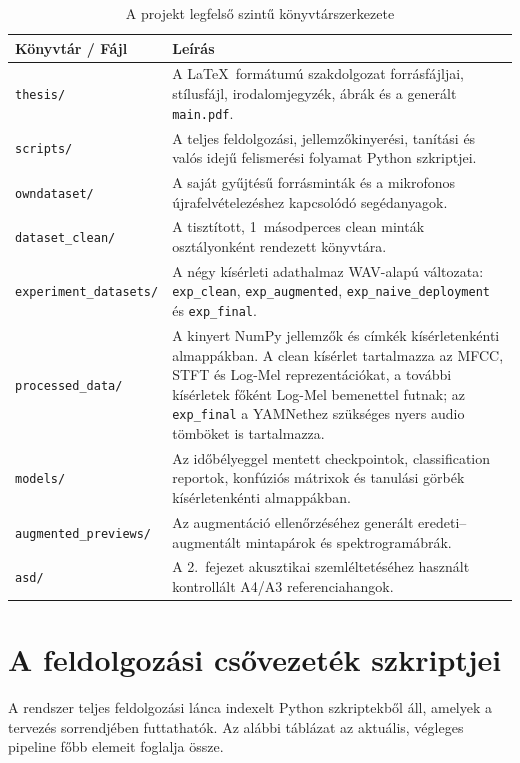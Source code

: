 \begin{table}[ht!]
\centering
\small
\caption{A projekt legfelső szintű könyvtárszerkezete}
\label{tab:konyvtarszerkezet}
\begin{tabular}{p{4.5cm}p{10cm}}
\toprule
\textbf{Könyvtár / Fájl} & \textbf{Leírás} \\
\midrule
\texttt{thesis/} & A \LaTeX\ formátumú szakdolgozat forrásfájljai, stílusfájl, irodalomjegyzék, ábrák és a generált \texttt{main.pdf}. \\
\texttt{scripts/} & A teljes feldolgozási, jellemzőkinyerési, tanítási és valós idejű felismerési folyamat Python szkriptjei. \\
\texttt{owndataset/} & A saját gyűjtésű forrásminták és a mikrofonos újrafelvételezéshez kapcsolódó segédanyagok. \\
\texttt{dataset\_clean/} & A tisztított, 1~másodperces clean minták osztályonként rendezett könyvtára. \\
\texttt{experiment\_\allowbreak datasets/} & A négy kísérleti adathalmaz WAV-alapú változata: \texttt{exp\_clean}, \texttt{exp\_augmented}, \texttt{exp\_naive\_deployment} és \texttt{exp\_final}. \\
\texttt{processed\_data/} & A kinyert NumPy jellemzők és címkék kísérletenkénti almappákban. A clean kísérlet tartalmazza az MFCC, STFT és Log-Mel reprezentációkat, a további kísérletek főként Log-Mel bemenettel futnak; az \texttt{exp\_final} a YAMNethez szükséges nyers audio tömböket is tartalmazza. \\
\texttt{models/} & Az időbélyeggel mentett checkpointok, classification reportok, konfúziós mátrixok és tanulási görbék kísérletenkénti almappákban. \\
\texttt{augmented\_\allowbreak previews/} & Az augmentáció ellenőrzéséhez generált eredeti--augmentált mintapárok és spektrogramábrák. \\
\texttt{asd/} & A 2.~fejezet akusztikai szemléltetéséhez használt kontrollált A4/A3 referenciahangok. \\
\bottomrule
\end{tabular}
\end{table}
\clearpage
\section{A feldolgozási csővezeték szkriptjei}
\label{sec:pipeline_scripts}

A rendszer teljes feldolgozási lánca indexelt Python szkriptekből áll, amelyek
a tervezés sorrendjében futtathatók. Az alábbi táblázat az aktuális, végleges
pipeline főbb elemeit foglalja össze.

